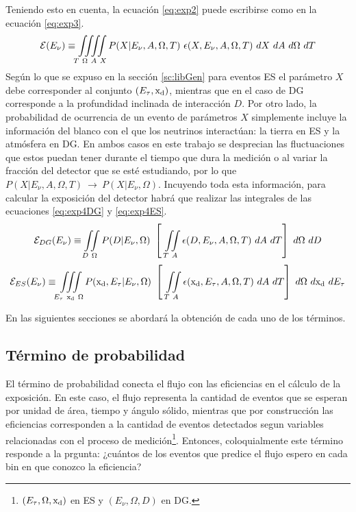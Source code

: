 	Teniendo esto en cuenta, la ecuación \ref{eq:exp2} puede escribirse como en la ecuación \ref{eq:exp3}.
	\begin{equation}
	 {\cal E}(E_\nu)\equiv\iiiint\limits_{T~\Omega~A~X}P(X|E_{\nu},A,\Omega,T)~\epsilon(X,E_{\nu},A,\Omega,T) ~dX~dA~d\Omega~dT
	 \label{eq:exp3}
	\end{equation}
	Según lo que se expuso en la sección \ref{sc:libGen} para eventos ES el parámetro $X$ debe corresponder al conjunto $(E_\tau,{\rm x_d})$, mientras que en el caso de DG corresponde a la profundidad inclinada de interacción $D$.
	Por otro lado, la probabilidad de ocurrencia de un evento de parámetros $X$ simplemente incluye la información del blanco con el que los neutrinos interactúan: la tierra en ES y la atmósfera en DG. 
	En ambos casos en este trabajo se desprecian las fluctuaciones que estos puedan tener durante el tiempo que dura la medición o al variar la fracción del detector que se esté estudiando, por lo que $P(X|E_{\nu},A,\Omega,T)~\rightarrow~P(X|E_{\nu},\Omega)$.
	Incuyendo toda esta información, para calcular la exposición del detector habrá que realizar las integrales de las ecuaciones \ref{eq:exp4DG} y \ref{eq:exp4ES}.
	\begin{equation}
	 {\cal E}_{DG}(E_\nu)\equiv\iint\limits_{D~\Omega}P(D|E_{\nu},\Omega)~
	 \left[~
	 \iint\limits_{T~A}\epsilon(D,E_{\nu},A,\Omega,T)~dA~dT
	 \right]
	 ~d\Omega~dD
	 \label{eq:exp4DG}
	\end{equation}
	\begin{equation}
	 {\cal E}_{ES}(E_\nu)\equiv\iiint\limits_{E_\tau~{\rm x_d}~\Omega}P({\rm x_d},E_\tau|E_{\nu},\Omega)~
	 \left[~
	 \iint\limits_{T~A}\epsilon({\rm x_d},E_\tau,A,\Omega,T)~dA~dT
	 \right]
	 ~d\Omega~d{\rm x_d}~dE_\tau
	 \label{eq:exp4ES}
	\end{equation}
	
	En las siguientes secciones se abordará la obtención de cada uno de los términos.
	
	\subsection{Término de probabilidad}
	
	El término de probabilidad conecta el flujo con las eficiencias en el cálculo de la exposición.
	En este caso, el flujo representa la cantidad de eventos que se esperan por unidad de área, tiempo y ángulo sólido, mientras que por construcción las eficiencias corresponden a la cantidad de eventos detectados segun variables relacionadas con el proceso de medición\footnote{$(E_\tau,\Omega,{\rm x_d})$ en ES y $(E_\nu,\Omega,D)$ en DG.}.
	Entonces, coloquialmente este término responde a la prgunta: ¿cuántos de los eventos que predice el flujo espero en cada bin en que conozco la eficiencia?
	
